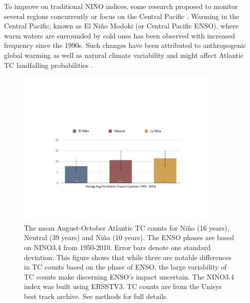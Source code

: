 To improve on traditional NINO indices, some research proposed to monitor several regions concurrently \cite{trenberth2001,ren2011} or focus on the Central Pacific \cite{ashok2007}. Warming in the Central Pacific, known as El Ni\~no Modoki (or Central Pacific ENSO), where warm waters are surrounded by cold ones has been observed with increased frequency since the 1990s. Such changes have been attributed to anthropogenic global warming \cite{yeh2009} as well as natural climate variability \cite{wittenberg2009} and might affect Atlantic TC landfalling probabilities \cite{kim2009}. 




 





\begin{figure}[htbp]
	\centering
		\includegraphics[height=3in]{figures/nino_tc_bars.pdf}
	\caption{The mean August-October Atlantic TC counts for Ni\~no (16 years), Neutral (39 years) and Ni\~na (10 years). The ENSO phases are based on NINO3.4 from 1950-2010. Error bars denote one standard deviation. This figure shows that while there are notable differences in TC counts based on the phase of ENSO, the large variability of TC counts make discerning ENSO's impact uncertain. The NINO3.4 index was built using ERSSTV3. TC counts are from the Unisys best track archive. See methods for full details.}
	\label{fig:figures_nino_tc_bars}
\end{figure}

